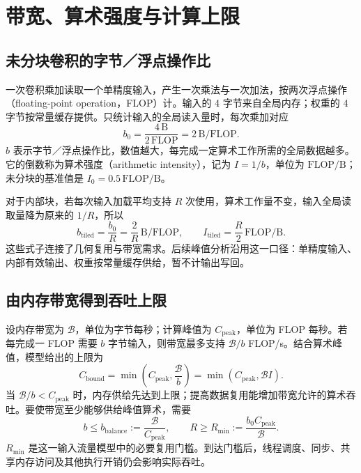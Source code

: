 \section{带宽、算术强度与计算上限}
\label{l9:sec:bandwidth}

\subsection{未分块卷积的字节／浮点操作比}
一次卷积乘加读取一个单精度输入，产生一次乘法与一次加法，按两次浮点操作（floating-point operation，FLOP）计。输入的 4 字节来自全局内存；权重的 4 字节按常量缓存提供。只统计输入的全局读入量时，每次乘加对应
\begin{equation}
 b_0=\frac{4\,\mathrm{B}}{2\,\mathrm{FLOP}}
 =2\,\mathrm{B}/\mathrm{FLOP}.
 \label{l9:eq:b0}
\end{equation}
$b$ 表示字节／浮点操作比，数值越大，每完成一定算术工作所需的全局数据越多。它的倒数称为算术强度（arithmetic intensity），记为 $I=1/b$，单位为 $\mathrm{FLOP}/\mathrm{B}$；未分块的基准值是 $I_0=0.5\,\mathrm{FLOP}/\mathrm{B}$。

对于内部块，若每次输入加载平均支持 $R$ 次使用，算术工作量不变，输入全局读取量降为原来的 $1/R$，所以
\begin{equation}
 b_{\mathrm{tiled}}=\frac{b_0}{R}=\frac{2}{R}\,\mathrm{B}/\mathrm{FLOP},
 \qquad
 I_{\mathrm{tiled}}=\frac{R}{2}\,\mathrm{FLOP}/\mathrm{B}.
 \label{l9:eq:arithmetic-intensity}
\end{equation}
这些式子连接了几何复用与带宽需求。后续峰值分析沿用这一口径：单精度输入、内部有效输出、权重按常量缓存供给，暂不计输出写回。

\subsection{由内存带宽得到吞吐上限}
设内存带宽为 $\mathcal B$，单位为字节每秒；计算峰值为 $C_{\mathrm{peak}}$，单位为 FLOP 每秒。若每完成一 FLOP 需要 $b$ 字节输入，则带宽最多支持 $\mathcal B/b$ FLOP/s。结合算术峰值，模型给出的上限为
\begin{equation}
 C_{\mathrm{bound}}
 =\min\!\left(C_{\mathrm{peak}},\frac{\mathcal B}{b}\right)
 =\min\!\left(C_{\mathrm{peak}},\mathcal B I\right).
 \label{l9:eq:throughput-bound}
\end{equation}
当 $\mathcal B/b<C_{\mathrm{peak}}$ 时，内存供给先达到上限；提高数据复用能增加带宽允许的算术吞吐。要使带宽至少能够供给峰值算术，需要
\begin{equation}
 b\le b_{\mathrm{balance}}:=\frac{\mathcal B}{C_{\mathrm{peak}}},
 \qquad
 R\ge R_{\min}:=\frac{b_0C_{\mathrm{peak}}}{\mathcal B}.
 \label{l9:eq:required-reuse}
\end{equation}
$R_{\min}$ 是这一输入流量模型中的必要复用门槛。到达门槛后，线程调度、同步、共享内存访问及其他执行开销仍会影响实际吞吐。

